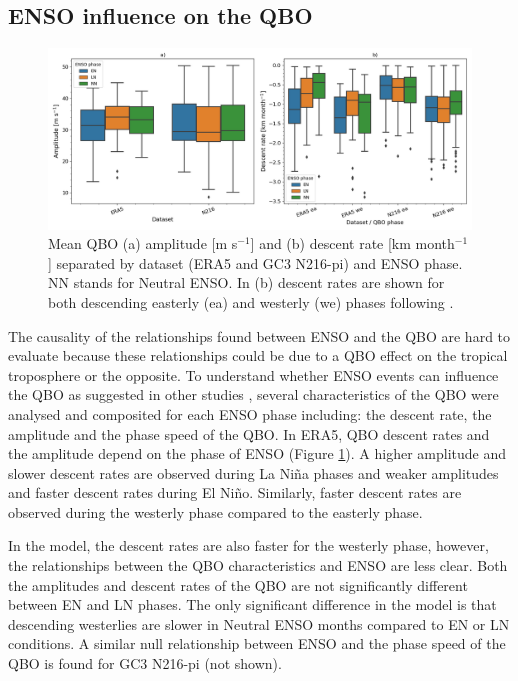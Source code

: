 \subsection{ENSO influence on the QBO}

\begin{figure}[t!]
\centering
 \noindent
 \includegraphics[width=\linewidth]{figures/scatter_qbom.png}
\caption[Scatter of relationship between QBO descent and amplitude and ENSO phase.]{Mean QBO (a) amplitude [m s$^{-1}$]  and (b) descent rate [km month$^{-1}$]  separated by dataset (ERA5 and GC3 N216-pi) and ENSO phase. NN stands for Neutral ENSO. In (b) descent rates are shown for both descending easterly (ea) and westerly (we) phases following \cite{schenzinger2017}. }
\label{fig:enso_on_qbo}
\end{figure}

The causality of the relationships found between ENSO and the QBO are hard to evaluate because these relationships could be due to a  QBO effect on the tropical troposphere or the opposite. 
To understand whether ENSO events can influence the QBO as suggested in other studies \citep{schirber2015,serva2020}, several characteristics of the QBO were analysed and composited for each ENSO phase including: the descent rate, the amplitude and the phase speed of the QBO. 
In ERA5, QBO descent rates and the amplitude depend on the phase of ENSO (Figure \ref{fig:enso_on_qbo}). A higher amplitude and slower descent rates are observed during La Niña phases and weaker amplitudes and faster descent rates during El Niño. Similarly, faster descent rates are observed during the westerly phase compared to the easterly phase.

In the model, the descent rates are also faster for the westerly phase, however, the relationships between the QBO characteristics and ENSO are less clear.  Both the amplitudes and descent rates of the QBO are not significantly different between EN and LN phases. The only significant difference in the model is that descending westerlies are slower in Neutral ENSO months compared to EN or LN conditions. 
A similar null relationship between ENSO and the phase speed of the QBO is found for GC3 N216-pi (not shown).

